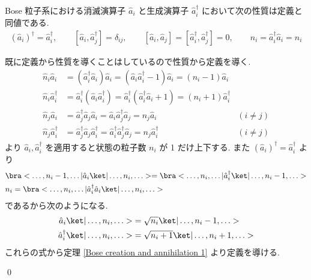 \documentclass[uplatex,dvipdfmx,a4paper,11pt]{jlreq}
\makeatletter
\numberwithin{equation}{section}
\theoremstyle{definition}
\renewenvironment{proof}[1][\proofname]{\par
  \normalfont
  \topsep6\p@\@plus6\p@ \trivlist
  \item[\hskip\labelsep{\bfseries #1}\@addpunct{\bfseries}]\ignorespaces\quad\par
}{
  \qed\endtrivlist\@endpefalse
}
\renewcommand\proofname{証明}
\makeatother
\begin{document}
\begin{theorem}[Q21-41(i)]
  Bose 粒子系における消滅演算子 $\hat{a}_i$ と生成演算子 $\hat{a}_i^\dagger$ において次の性質は定義と同値である.
  \begin{align}
    (\hat{a}_i)^\dagger = \hat{a}_i^\dagger, \qquad [\hat{a}_i, \hat{a}_j^\dagger] = \delta_{ij}, \qquad [\hat{a}_i, \hat{a}_j] = [\hat{a}_i^\dagger, \hat{a}_j^\dagger] = 0, \qquad \hat{n}_i = \hat{a}_i^\dagger\hat{a}_i = n_i
  \end{align}
\end{theorem}
\begin{proof}
  既に定義から性質を導くことはしているので性質から定義を導く.
  \begin{align}
    \hat{n}_i\hat{a}_i         & = (\hat{a}_i^\dagger\hat{a}_i)\hat{a}_i = (\hat{a}_i\hat{a}_i^\dagger - 1)\hat{a}_i = (n_i - 1)\hat{a}_i                                     \\
    \hat{n}_i\hat{a}_i^\dagger & = \hat{a}_i^\dagger(\hat{a}_i\hat{a}_i^\dagger) = \hat{a}_i^\dagger(\hat{a}_i^\dagger\hat{a}_i + 1) = (n_i + 1)\hat{a}_i^\dagger             \\
    \hat{n}_j\hat{a}_i         & = \hat{a}_j^\dagger\hat{a}_j\hat{a}_i = \hat{a}_i\hat{a}_j^\dagger\hat{a}_j = n_j\hat{a}_i                                       & (i\neq j) \\
    \hat{n}_j\hat{a}_i^\dagger & = \hat{a}_j^\dagger\hat{a}_j\hat{a}_i^\dagger = \hat{a}_i^\dagger\hat{a}_j^\dagger\hat{a}_j = n_j\hat{a}_i^\dagger               & (i\neq j)
  \end{align}
  より $\hat{a}_i, \hat{a}_i^\dagger$ を適用すると状態の粒子数 $n_i$ が 1 だけ上下する. また $(\hat{a}_i)^\dagger = \hat{a}_i^\dagger$ より
  \begin{align}
     & \bra<\ldots,n_i-1,\ldots|\hat{a}_i\ket|\ldots,n_i,\ldots> = \bra<\ldots,n_i,\ldots|\hat{a}_i^\dagger\ket|\ldots,n_i-1,\ldots> \\
     & n_i = \bra<\ldots,n_i,\ldots|\hat{a}_i^\dagger\hat{a}_i\ket|\ldots,n_i,\ldots>
  \end{align}
  であるから次のようになる.
  \begin{align}
    \hat{a}_i\ket|\ldots,n_i,\ldots>         & = \sqrt{n_i}\ket|\ldots,n_i-1,\ldots>     \\
    \hat{a}_i^\dagger\ket|\ldots,n_i,\ldots> & = \sqrt{n_i + 1}\ket|\ldots,n_i+1,\ldots>
  \end{align}
  これらの式から定理 \ref{Bose creation and annihilation 1} より定義を導ける.
\end{proof}
\end{document}
